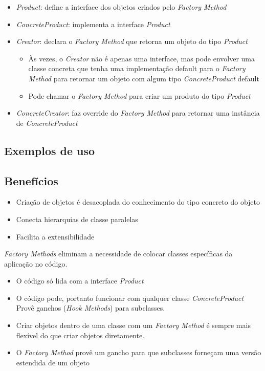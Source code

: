 \begin{itemize}
	\item \emph{Product}: define a interface dos objetos criados pelo \emph{Factory Method}
	\item \emph{ConcreteProduct}: implementa a interface \emph{Product}
	\item \emph{Creator}: declara o \emph{Factory Method} que retorna um objeto do tipo \emph{Product}
		\begin{itemize}
			\item  Às vezes, o \emph{Creator} não é apenas uma interface, mas pode envolver uma
classe concreta que tenha uma implementação default para o \emph{Factory Method} para retornar um objeto com algum tipo \emph{ConcreteProduct} default
			\item Pode chamar o \emph{Factory Method} para criar um produto do tipo \emph{Product}
		\end{itemize}
	\item \emph{ConcreteCreator}: faz override do \emph{Factory Method} para retornar uma instância de \emph{ConcreteProduct}
\end{itemize}


\subsection{Exemplos de uso}
\label{sub:fac_uso}

\subsection{Benefícios}
\label{sub:fac_beneficios}

\begin{itemize}
	\item Criação de objetos é desacoplada do conhecimento do tipo concreto do objeto
	\item Conecta hierarquias de classe paralelas
	\item Facilita a extensibilidade
\end{itemize}

\emph{Factory Methods} eliminam a necessidade de colocar classes específicas da aplicação no código.\cite{fact2}

\begin{itemize}
	\item O código só lida com a interface \emph{Product}
	\item O código pode, portanto funcionar com qualquer classe \emph{ConcreteProduct} Provê ganchos (\emph{Hook Methods}) para subclasses.
	\item Criar objetos dentro de uma classe com um \emph{Factory Method} é sempre mais flexível do que criar objetos diretamente.
	\item O \emph{Factory Method} provê um gancho para que subclasses forneçam uma versão estendida de um objeto
\end{itemize}
